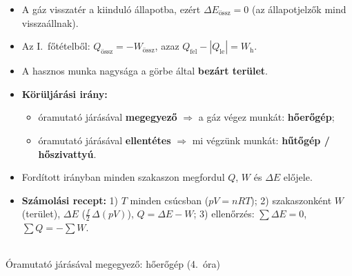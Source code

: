 \documentclass[11pt,a4paper]{article}
\begin{document}
\begin{minipage}[t]{0.58\linewidth}\vspace{0pt}
\begin{itemize}
  \item A gáz visszatér a kiinduló állapotba, ezért \textbf{$\Delta E_\text{össz} = 0$}
    (az állapotjelzők mind visszaállnak).
  \item Az I.~főtételből: $Q_\text{össz} = -W_\text{össz}$, azaz
    $Q_\text{fel} - |Q_\text{le}| = W_\text{h}$.
  \item A hasznos munka nagysága a görbe által \textbf{bezárt terület}.
  \item \textbf{Körüljárási irány:}
    \begin{itemize}
      \item óramutató járásával \textbf{megegyező} $\Rightarrow$ a gáz végez munkát:
        \textbf{hőerőgép};
      \item óramutató járásával \textbf{ellentétes} $\Rightarrow$ mi végzünk munkát:
        \textbf{hűtőgép / hőszivattyú}.
    \end{itemize}
  \item Fordított irányban minden szakaszon megfordul $Q$, $W$ és $\Delta E$ előjele.
  \item \textbf{Számolási recept:} 1) $T$ minden csúcsban ($pV = nRT$);
    2) szakaszonként $W$ (terület), $\Delta E$ ($\tfrac f2\,\Delta(pV)$), $Q = \Delta E - W$;
    3) ellenőrzés: $\sum \Delta E = 0$, $\sum Q = -\sum W$.
\end{itemize}
\end{minipage}\hfill
\begin{minipage}[t]{0.38\linewidth}\vspace{0pt}\centering
{}\\
{\small Óramutató járásával megegyező: hőerőgép (4.~óra)}
\end{minipage}
\end{document}
